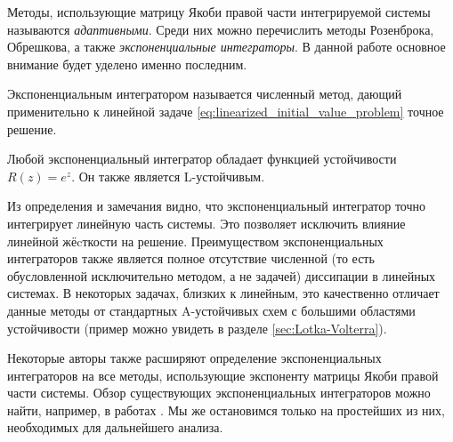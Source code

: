 Методы, использующие матрицу Якоби правой части интегрируемой системы называются \emph{адаптивными}.
Среди них можно перечислить методы Розенброка, Обрешкова, а также \emph{экспоненциальные интеграторы}.
В данной работе основное внимание будет уделено именно последним.

\begin{definition}
    \label{def:exponential_integrator}
    Экспоненциальным интегратором называется численный метод,
    дающий применительно к линейной задаче \eqref{eq:linearized_initial_value_problem} точное решение.
\end{definition}

\begin{remark}
    \label{rem:exponential_integrator_stability_function}
    Любой экспоненциальный интегратор обладает функцией устойчивости $ R(z) = e^z $.
    Он также является L-устойчивым.
\end{remark}

Из определения и замечания видно, что экспоненциальный интегратор точно интегрирует линейную часть системы.
Это позволяет исключить влияние линейной жёcткости на решение.
Преимуществом экспоненциальных интеграторов также является полное отсутствие численной
(то есть обусловленной исключительно методом, а не задачей) диссипации в линейных системах.
В некоторых задачах, близких к линейным, это качественно отличает данные методы от
стандартных A-устойчивых схем с большими областями устойчивости
(пример можно увидеть в разделе \ref{sec:Lotka-Volterra}).

Некоторые авторы также расширяют определение экспоненциальных интеграторов на все методы,
использующие экспоненту матрицы Якоби правой части системы.
Обзор существующих экспоненциальных интеграторов можно найти, например, в работах \cite{minchev2005expint, hochbruck_ostermann_2010}.
Мы же остановимся только на простейших из них, необходимых для дальнейшего анализа.

